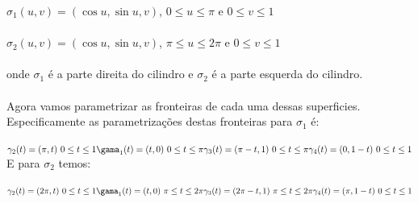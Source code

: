 \documentclass[11pt,a4paper]{article}
\begin{document}
\begin{enumerate}
{                        $\sigma_1 (u,v) = (\cos u,\sin u ,v)$, $0 \leq u \leq \pi$ e $0 \leq v \leq 1$\\\\
                        $\sigma_2 (u,v) = (\cos u,\sin u ,v)$, $\pi \leq u \leq 2\pi$ e $0 \leq v \leq 1$\\\\
                        onde $\sigma_1$ é a parte direita do cilindro e $\sigma_2$ é a parte esquerda do cilindro.\\\\
                        Agora vamos parametrizar as fronteiras de cada uma dessas superficies. Especificamente as parametrizações destas fronteiras para $\sigma_1$ é:\\\\
                        $\gamma_2 (t) = (\pi,t)\ 0 \leq t \leq 1 \\\\
                        \\\\
                        \gama_1 (t) = (t,0)\ 0 \leq t \leq \pi \\\\
                        \gamma_3 (t) = (\pi -t,1)\ 0 \leq t \leq \pi \\\\
                        \\\\
                        \gamma_4 (t) = (0,1-t)\ 0\leq t \leq 1\\\\$
                        E para $\sigma_2$ temos:\\\\
                        $\gamma_2 (t) = (2\pi,t)\ 0 \leq t \leq 1 \\\\
                        \\\\
                        \gama_1 (t) = (t,0)\ \pi \leq t \leq 2\pi \\\\
                        \gamma_3 (t) = (2\pi -t,1)\ \pi \leq t \leq 2\pi \\\\
                        \\\\
                        \gamma_4 (t) = (\pi,1-t)\ 0\leq t \leq 1\\\\$
}
\end{enumerate}
\end{document}
